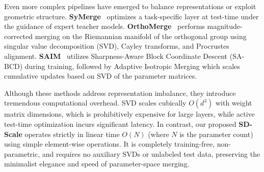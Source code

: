 Even more complex pipelines have emerged to balance representations or exploit geometric structure. \textbf{SyMerge}~\cite{symerge2025synergistic} optimizes a task-specific layer at test-time under the guidance of expert teacher models. \textbf{OrthoMerge}~\cite{orthomerge25manf} performs magnitude-corrected merging on the Riemannian manifold of the orthogonal group using singular value decomposition (SVD), Cayley transforms, and Procrustes alignment. \textbf{SAIM}~\cite{saim25flat} utilizes Sharpness-Aware Block Coordinate Descent (SA-BCD) during training, followed by Adaptive Isotropic Merging which scales cumulative updates based on SVD of the parameter matrices. 

Although these methods address representation imbalance, they introduce tremendous computational overhead. SVD scales cubically $O(d^3)$ with weight matrix dimensions, which is prohibitively expensive for large layers, while active test-time optimization incurs significant latency. In contrast, our proposed \textbf{SD-Scale} operates strictly in linear time $O(N)$ (where $N$ is the parameter count) using simple element-wise operations. It is completely training-free, non-parametric, and requires no auxiliary SVDs or unlabeled test data, preserving the minimalist elegance and speed of parameter-space merging.
